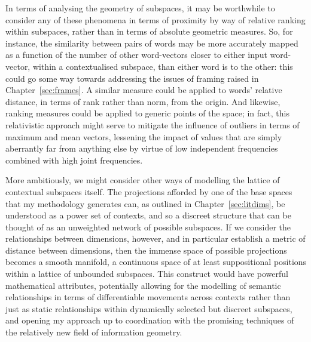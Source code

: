 In terms of analysing the geometry of subspaces, it may be worthwhile to consider any of these phenomena in terms of proximity by way of relative ranking within subspaces, rather than in terms of absolute geometric measures.  So, for instance, the similarity between pairs of words may be more accurately mapped as a function of the number of other word-vectors closer to either input word-vector, within a contextualised subspace, than either word is to the other: this could go some way towards addressing the issues of framing raised in Chapter~\ref{sec:frames}.  A similar measure could be applied to words' relative distance, in terms of rank rather than norm, from the origin.  And likewise, ranking measures could be applied to generic points of the space; in fact, this relativistic approach might serve to mitigate the influence of outliers in terms of maximum and mean vectors, lessening the impact of values that are simply aberrantly far from anything else by virtue of low independent frequencies combined with high joint frequencies.

More ambitiously, we might consider other ways of modelling the lattice of contextual subspaces itself.  The projections afforded by one of the base spaces that my methodology generates can, as outlined in Chapter~\ref{sec:litdims}, be understood as a power set of contexts, and so a discreet structure that can be thought of as an unweighted network of possible subspaces.  If we consider the relationships between dimensions, however, and in particular establish a metric of distance between dimensions, then the immense space of possible projections becomes a smooth manifold, a continuous space of at least suppositional positions within a lattice of unbounded subspaces.  This construct would have powerful mathematical attributes, potentially allowing for the modelling of semantic relationships in terms of differentiable movements across contexts rather than just as static relationships within dynamically selected but discreet subspaces, and opening my approach up to coordination with the promising techniques of the relatively new field of information geometry.

